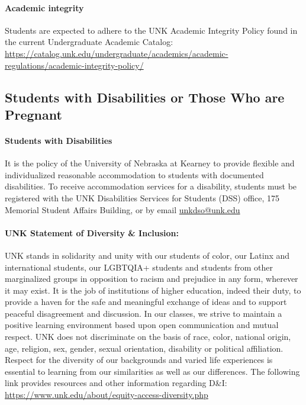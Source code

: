 \documentclass[12pt]{article}
\newcounter{ex}\setcounter{ex}{0}
\begin{document}
\paragraph{Academic integrity} Students are expected to adhere to 
the UNK Academic Integrity Policy found in the current Undergraduate 
Academic Catalog: 
\url{https://catalog.unk.edu/undergraduate/academics/academic-regulations/academic-integrity-policy/}

\subsection*{Students with Disabilities or Those Who are Pregnant}

\paragraph{Students with Disabilities} It is the policy of the University of Nebraska 
at Kearney to provide flexible and individualized reasonable 
accommodation to students with documented disabilities. To receive 
accommodation services for a disability, students must be
registered with the UNK Disabilities Services for Students (DSS) 
office, 175 Memorial Student Affairs Building, 
 or 
by email \href{mailto:unkdso@unk.edu}{unkdso@unk.edu}

\paragraph{UNK Statement of Diversity \& Inclusion:} UNK stands in solidarity and unity with our students of color, our Latinx and international students, our LGBTQIA+ students and students from other marginalized groups in opposition to racism and prejudice in any form, wherever it may exist. It is the job of institutions of higher education, indeed their duty, to provide a haven for the safe and meaningful exchange of ideas and to support peaceful disagreement and discussion. In our classes, we strive to maintain a positive learning environment based upon open communication and mutual respect. UNK does not discriminate on the basis of race, color, national origin, age, religion, sex, gender, sexual orientation, disability or political affiliation. Respect for the diversity of our backgrounds and varied 
life experiences is essential to learning from our similarities as well as our differences. The following link provides resources and other information regarding D\&I: 
\url{https://www.unk.edu/about/equity-access-diversity.php}
\end{document}
